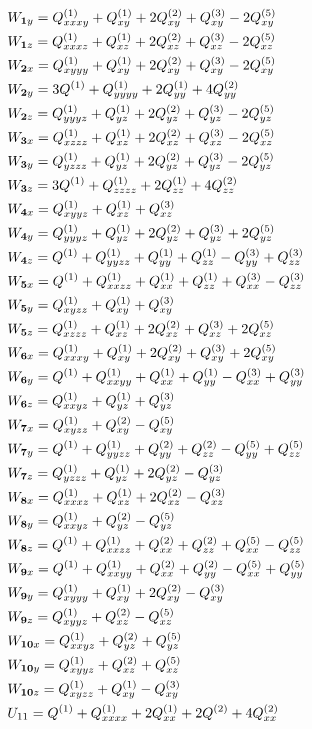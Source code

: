 \documentclass[11pt]{easymemo}
\begin{document}
\begin{align}
\cr&
W_{\textbf{1}y}=Q^{(1)}_{xxxy} + Q^{(1)}_{xy} + 2Q^{(2)}_{xy} + Q^{(3)}_{xy} - 2Q^{(5)}_{xy}
\cr&
W_{\textbf{1}z}=Q^{(1)}_{xxxz} + Q^{(1)}_{xz} + 2Q^{(2)}_{xz} + Q^{(3)}_{xz} - 2Q^{(5)}_{xz}
\cr&
W_{\textbf{2}x}=Q^{(1)}_{xyyy} + Q^{(1)}_{xy} + 2Q^{(2)}_{xy} + Q^{(3)}_{xy} - 2Q^{(5)}_{xy}
\cr&
W_{\textbf{2}y}=3Q^{(1)} + Q^{(1)}_{yyyy} + 2Q^{(1)}_{yy} + 4Q^{(2)}_{yy}
\cr&
W_{\textbf{2}z}=Q^{(1)}_{yyyz} + Q^{(1)}_{yz} + 2Q^{(2)}_{yz} + Q^{(3)}_{yz} - 2Q^{(5)}_{yz}
\cr&
W_{\textbf{3}x}=Q^{(1)}_{xzzz} + Q^{(1)}_{xz} + 2Q^{(2)}_{xz} + Q^{(3)}_{xz} - 2Q^{(5)}_{xz}
\cr&
W_{\textbf{3}y}=Q^{(1)}_{yzzz} + Q^{(1)}_{yz} + 2Q^{(2)}_{yz} + Q^{(3)}_{yz} - 2Q^{(5)}_{yz}
\cr&
W_{\textbf{3}z}=3Q^{(1)} + Q^{(1)}_{zzzz} + 2Q^{(1)}_{zz} + 4Q^{(2)}_{zz}
\cr&
W_{\textbf{4}x}=Q^{(1)}_{xyyz} + Q^{(1)}_{xz} + Q^{(3)}_{xz}
\cr&
W_{\textbf{4}y}=Q^{(1)}_{yyyz} + Q^{(1)}_{yz} + 2Q^{(2)}_{yz} + Q^{(3)}_{yz} + 2Q^{(5)}_{yz}
\cr&
W_{\textbf{4}z}=Q^{(1)} + Q^{(1)}_{yyzz} + Q^{(1)}_{yy} + Q^{(1)}_{zz} - Q^{(3)}_{yy} + Q^{(3)}_{zz}
\cr&
W_{\textbf{5}x}=Q^{(1)} + Q^{(1)}_{xxzz} + Q^{(1)}_{xx} + Q^{(1)}_{zz} + Q^{(3)}_{xx} - Q^{(3)}_{zz}
\cr&
W_{\textbf{5}y}=Q^{(1)}_{xyzz} + Q^{(1)}_{xy} + Q^{(3)}_{xy}
\cr&
W_{\textbf{5}z}=Q^{(1)}_{xzzz} + Q^{(1)}_{xz} + 2Q^{(2)}_{xz} + Q^{(3)}_{xz} + 2Q^{(5)}_{xz}
\cr&
W_{\textbf{6}x}=Q^{(1)}_{xxxy} + Q^{(1)}_{xy} + 2Q^{(2)}_{xy} + Q^{(3)}_{xy} + 2Q^{(5)}_{xy}
\cr&
W_{\textbf{6}y}=Q^{(1)} + Q^{(1)}_{xxyy} + Q^{(1)}_{xx} + Q^{(1)}_{yy} - Q^{(3)}_{xx} + Q^{(3)}_{yy}
\cr&
W_{\textbf{6}z}=Q^{(1)}_{xxyz} + Q^{(1)}_{yz} + Q^{(3)}_{yz}
\cr&
W_{\textbf{7}x}=Q^{(1)}_{xyzz} + Q^{(2)}_{xy} - Q^{(5)}_{xy}
\cr&
W_{\textbf{7}y}=Q^{(1)} + Q^{(1)}_{yyzz} + Q^{(2)}_{yy} + Q^{(2)}_{zz} - Q^{(5)}_{yy} + Q^{(5)}_{zz}
\cr&
W_{\textbf{7}z}=Q^{(1)}_{yzzz} + Q^{(1)}_{yz} + 2Q^{(2)}_{yz} - Q^{(3)}_{yz}
\cr&
W_{\textbf{8}x}=Q^{(1)}_{xxxz} + Q^{(1)}_{xz} + 2Q^{(2)}_{xz} - Q^{(3)}_{xz}
\cr&
W_{\textbf{8}y}=Q^{(1)}_{xxyz} + Q^{(2)}_{yz} - Q^{(5)}_{yz}
\cr&
W_{\textbf{8}z}=Q^{(1)} + Q^{(1)}_{xxzz} + Q^{(2)}_{xx} + Q^{(2)}_{zz} + Q^{(5)}_{xx} - Q^{(5)}_{zz}
\cr&
W_{\textbf{9}x}=Q^{(1)} + Q^{(1)}_{xxyy} + Q^{(2)}_{xx} + Q^{(2)}_{yy} - Q^{(5)}_{xx} + Q^{(5)}_{yy}
\cr&
W_{\textbf{9}y}=Q^{(1)}_{xyyy} + Q^{(1)}_{xy} + 2Q^{(2)}_{xy} - Q^{(3)}_{xy}
\cr&
W_{\textbf{9}z}=Q^{(1)}_{xyyz} + Q^{(2)}_{xz} - Q^{(5)}_{xz}
\cr&
W_{\textbf{10}x}=Q^{(1)}_{xxyz} + Q^{(2)}_{yz} + Q^{(5)}_{yz}
\cr&
W_{\textbf{10}y}=Q^{(1)}_{xyyz} + Q^{(2)}_{xz} + Q^{(5)}_{xz}
\cr&
W_{\textbf{10}z}=Q^{(1)}_{xyzz} + Q^{(1)}_{xy} - Q^{(3)}_{xy}
\\&
U_{11}=Q^{(1)} + Q^{(1)}_{xxxx} + 2Q^{(1)}_{xx} + 2Q^{(2)} + 4Q^{(2)}_{xx}

\end{align}
\end{document}
